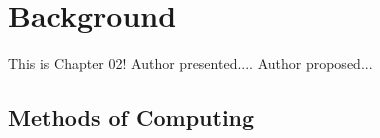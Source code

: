 \newcommand{\package}[1]{\textbf{#1}} %
\newcommand{\cmmd}[1]{\textbackslash\texttt{#1}} %


\chapter{Background}

This is Chapter 02!
Author \cite{al2020generalizing} presented....
Author \cite{elayan2021digital} proposed...

\section{Methods of Computing}
